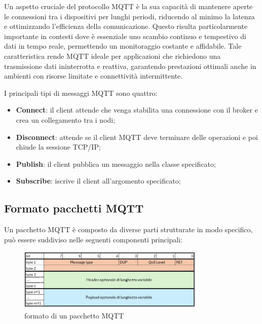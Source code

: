 \documentclass[12pt,a4paper,openright,twoside]{book}
\begin{document}
Un aspetto cruciale del protocollo \ac{MQTT} è la sua capacità di mantenere aperte le connessioni tra i dispositivi per lunghi periodi, riducendo al minimo la latenza 
e ottimizzando l'efficienza della comunicazione. Questo risulta particolarmente importante in contesti dove è essenziale uno scambio continuo e tempestivo di dati 
in tempo reale, permettendo un monitoraggio costante e affidabile. Tale caratteristica rende \ac{MQTT} ideale per applicazioni che richiedono una trasmissione dati 
ininterrotta e reattiva, garantendo prestazioni ottimali anche in ambienti con risorse limitate e connettività intermittente.

I principali tipi di messaggi \ac{MQTT} sono quattro:
\begin{itemize}
    \item \textbf{Connect}: il client attende che venga stabilita una connessione con il broker e crea un collegamento tra i nodi;
    \item \textbf{Disconnect}: attende se il client \ac{MQTT} deve terminare delle operazioni e poi chiude la sessione TCP/IP;
    \item \textbf{Publish}: il client pubblica un messaggio nella classe specificato;
    \item \textbf{Subscribe}: iscrive il client all’argomento specificato;
\end{itemize}

\subsection{Formato pacchetti MQTT}
Un pacchetto \ac{MQTT} è composto da diverse parti strutturate in modo specifico, può essere suddiviso nelle seguenti componenti principali:

\begin{figure}[H]
    \centering
    \includegraphics[width=0.8\textwidth]{figures/mqtt-packet.png}
    \caption{formato di un pacchetto MQTT}
    \label{fig:mqtt-packet}
\end{figure}
\end{document}
